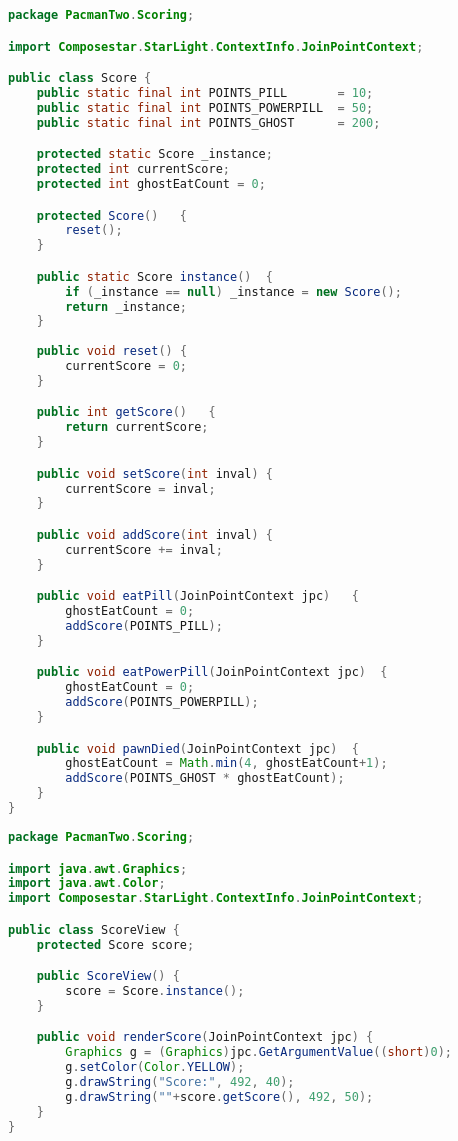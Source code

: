 \begin{lstlisting}[style=floatlisting,language=Java,%
                   caption={Implementation of class \expandafter{\lstinline[style=inline]|Score|}},%
                   label={lst:score_impl}]
package PacmanTwo.Scoring;

import Composestar.StarLight.ContextInfo.JoinPointContext;

public class Score {
	public static final int POINTS_PILL       = 10;
	public static final int POINTS_POWERPILL  = 50;
	public static final int POINTS_GHOST      = 200;

	protected static Score _instance;	
	protected int currentScore;
	protected int ghostEatCount = 0;

	protected Score()	{
		reset();
	}

	public static Score instance()	{
		if (_instance == null) _instance = new Score();
		return _instance;
	}
	
	public void reset()	{
		currentScore = 0;
	}

	public int getScore()	{
		return currentScore;
	}

	public void setScore(int inval)	{
		currentScore = inval;
	}

	public void addScore(int inval)	{
		currentScore += inval;
	}

	public void eatPill(JoinPointContext jpc)	{
		ghostEatCount = 0;
		addScore(POINTS_PILL);
	}

	public void eatPowerPill(JoinPointContext jpc)	{
		ghostEatCount = 0;
		addScore(POINTS_POWERPILL);
	}

	public void pawnDied(JoinPointContext jpc)	{
		ghostEatCount = Math.min(4, ghostEatCount+1);
		addScore(POINTS_GHOST * ghostEatCount);
	}
}
\end{lstlisting}

\begin{lstlisting}[style=floatlisting,language=Java,%
                   caption={Implementation of class \expandafter{\lstinline[style=inline]|ScoreView|}},%
                   label={lst:scoreview_impl}]
package PacmanTwo.Scoring;

import java.awt.Graphics;
import java.awt.Color;
import Composestar.StarLight.ContextInfo.JoinPointContext;

public class ScoreView {
	protected Score score;

	public ScoreView() {
		score = Score.instance();
	}

	public void renderScore(JoinPointContext jpc) {
		Graphics g = (Graphics)jpc.GetArgumentValue((short)0);
		g.setColor(Color.YELLOW);
		g.drawString("Score:", 492, 40);
		g.drawString(""+score.getScore(), 492, 50);
	}
}
\end{lstlisting}

